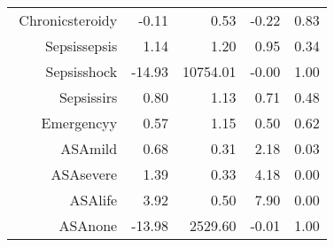 \begin{tabular}{rrrrr}
$$  Chronic\-steroid\-y & -0.11 & 0.53 & -0.22 & 0.83 \\ 
  Sepsis\-sepsis & 1.14 & 1.20 & 0.95 & 0.34 \\ 
  Sepsis\-shock & -14.93 & 10754.01 & -0.00 & 1.00 \\ 
  Sepsis\-sirs & 0.80 & 1.13 & 0.71 & 0.48 \\ 
  Emergency\-y & 0.57 & 1.15 & 0.50 & 0.62 \\ 
  ASA\-mild & 0.68 & 0.31 & 2.18 & 0.03 \\ 
  ASA\-severe & 1.39 & 0.33 & 4.18 & 0.00 \\ 
  ASA\-life & 3.92 & 0.50 & 7.90 & 0.00 \\ 
  ASA\-none & -13.98 & 2529.60 & -0.01 & 1.00 \\ 
   \hline
\end{tabular}

